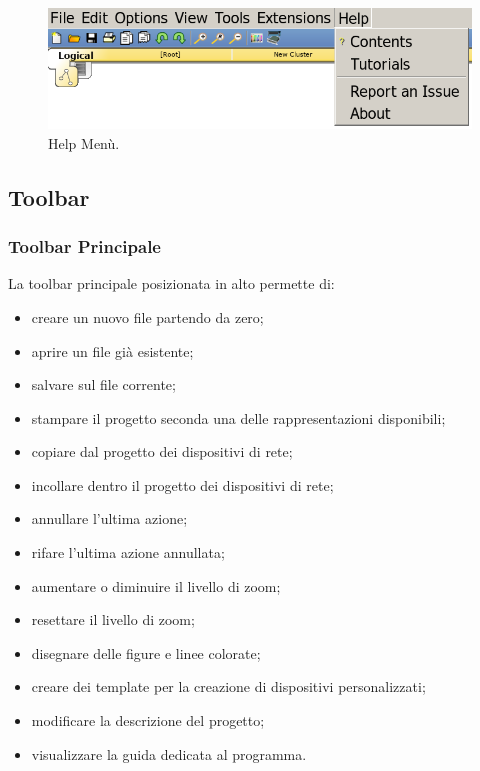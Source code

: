 \begin{figure}[htbp]
    \centerline{\includegraphics[scale=.3]{images/02.packet-tracer/help.png}}
    \caption{Help Menù.}
\end{figure}

\subsection{Toolbar} %

\subsubsection{Toolbar Principale}
La toolbar principale posizionata in alto permette di:

\begin{itemize}
    \item creare un nuovo file partendo da zero;
    \item aprire un file già esistente;
    \item salvare sul file corrente;
    \item stampare il progetto seconda una delle rappresentazioni disponibili;
    \item copiare dal progetto dei dispositivi di rete;
    \item incollare dentro il progetto dei dispositivi di rete;
    \item annullare l'ultima azione;
    \item rifare l'ultima azione annullata;
    \item aumentare o diminuire il livello di zoom;
    \item resettare il livello di zoom;
    \item disegnare delle figure e linee colorate;
    \item creare dei template per la creazione di dispositivi personalizzati;
    \item modificare la descrizione del progetto;
    \item visualizzare la guida dedicata al programma.
\end{itemize}

